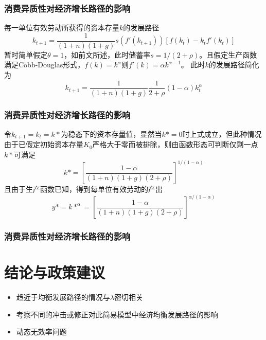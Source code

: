 \documentclass{beamer}
\begin{document}
\begin{frame}
\frametitle{消费异质性对经济增长路径的影响} 
每一单位有效劳动所获得的资本存量$k$的发展路径
\begin{equation*}
k_{t+1}=\frac{1}{(1+n)(1+g)}s(f'(k_{t+1}))[f(k_t)-k_tf'(k_t)]
\end{equation*}
暂时简单假定$\theta=1$，如前文所述，此时储蓄率$s=1/(2+\rho)$。且假定生产函数满足Cobb-Douglas形式，$f(k)=k^\alpha$则$f'(k)=\alpha k^{\alpha-1}$。
此时$k$的发展路径简化为
\begin{equation*}
k_{t+1}=\frac{1}{(1+n)(1+g)}\frac{1}{2+\rho}(1-\alpha)k_{t}^\alpha
\end{equation*}
\end{frame}

\begin{frame}
\frametitle{消费异质性对经济增长路径的影响}
令$k_{t+1}=k_t=k*$为稳态下的资本存量值，显然当$k*=0$时上式成立，但此种情况由于已假定初始资本存量$K_0$严格大于零而被排除，则由函数形态可判断仅剩一点$k*$可满足
\begin{equation*}
k*=[\frac{1-\alpha}{(1+n)(1+g)(2+\rho)}]^{1/(1-\alpha)}
\end{equation*}
且由于生产函数已知，得到每单位有效劳动的产出
\begin{equation*}
y*=k*^\alpha=[\frac{1-\alpha}{(1+n)(1+g)(2+\rho)}]^{\alpha/(1-\alpha)}
\end{equation*}
\end{frame}

\begin{frame}
\frametitle{消费异质性对经济增长路径的影响}
\section{结论与政策建议}
\begin{itemize}
\item 趋近于均衡发展路径的情况与$\lambda$密切相关
\item 考察不同的冲击或修正对此简易模型中经济均衡发展路径的影响
\item 动态无效率问题
\end{itemize}
\end{frame}
\end{document}
